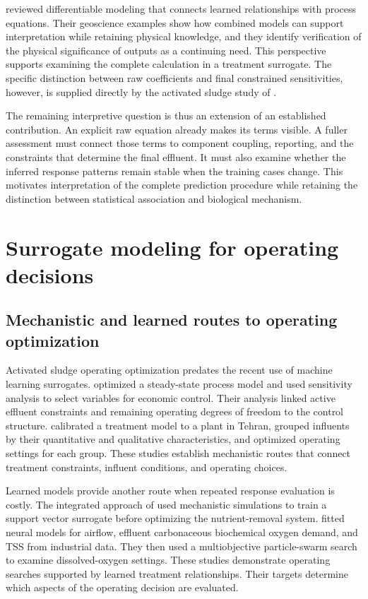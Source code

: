 \citet{Shen2023} reviewed differentiable modeling that connects learned relationships with process equations. Their geoscience examples show how combined models can support interpretation while retaining physical knowledge, and they identify verification of the physical significance of outputs as a continuing need. This perspective supports examining the complete calculation in a treatment surrogate. The specific distinction between raw coefficients and final constrained sensitivities, however, is supplied directly by the activated sludge study of \citet{Selerio2026}.

The remaining interpretive question is thus an extension of an established contribution. An explicit raw equation already makes its terms visible. A fuller assessment must connect those terms to component coupling, reporting, and the constraints that determine the final effluent. It must also examine whether the inferred response patterns remain stable when the training cases change. This motivates interpretation of the complete prediction procedure while retaining the distinction between statistical association and biological mechanism.

\section{Surrogate modeling for operating decisions}

\subsection{Mechanistic and learned routes to operating optimization}

Activated sludge operating optimization predates the recent use of machine learning surrogates. \citet{Araujo2013} optimized a steady-state process model and used sensitivity analysis to select variables for economic control. Their analysis linked active effluent constraints and remaining operating degrees of freedom to the control structure. \citet{Nazif2023} calibrated a treatment model to a plant in Tehran, grouped influents by their quantitative and qualitative characteristics, and optimized operating settings for each group. These studies establish mechanistic routes that connect treatment constraints, influent conditions, and operating choices.

Learned models provide another route when repeated response evaluation is costly. The integrated approach of \citet{Fang2011} used mechanistic simulations to train a support vector surrogate before optimizing the nutrient-removal system. \citet{KusiakWei2013} fitted neural models for airflow, effluent carbonaceous biochemical oxygen demand, and TSS from industrial data. They then used a multiobjective particle-swarm search to examine dissolved-oxygen settings. These studies demonstrate operating searches supported by learned treatment relationships. Their targets determine which aspects of the operating decision are evaluated.

